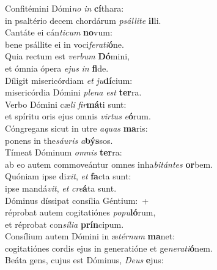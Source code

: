 \evenverse Confitémini Dómi\textit{no} \textit{in} \textbf{cí}thara:~\*\\
\evenverse in psaltério decem chordárum \textit{psál}\textit{li}\textit{te} \textbf{il}li.\\
\oddverse Cantáte ei cán\textit{ti}\textit{cum} \textbf{no}vum:~\*\\
\oddverse bene psállite ei in voci\textit{fe}\textit{ra}\textit{ti}\textbf{ó}ne.\\
\evenverse Quia rectum est \textit{ver}\textit{bum} \textbf{Dó}mini,~\*\\
\evenverse et ómnia ópera \textit{e}\textit{jus} \textit{in} \textbf{fi}de.\\
\oddverse Díligit misericórdiam \textit{et} \textit{ju}\textbf{dí}cium:~\*\\
\oddverse misericórdia Dómini \textit{ple}\textit{na} \textit{est} \textbf{ter}ra.\\
\evenverse Verbo Dómini cæ\textit{li} \textit{fir}\textbf{má}ti sunt:~\*\\
\evenverse et spíritu oris ejus omnis \textit{vir}\textit{tus} \textit{e}\textbf{ó}rum.\\
\oddverse Cóngregans sicut in utre \textit{a}\textit{quas} \textbf{ma}ris:~\*\\
\oddverse ponens in the\textit{sáu}\textit{ris} \textit{a}\textbf{býs}sos.\\
\evenverse Tímeat Dóminum \textit{om}\textit{nis} \textbf{ter}ra:~\*\\
\evenverse ab eo autem commoveántur omnes inha\textit{bi}\textit{tán}\textit{tes} \textbf{or}bem.\\
\oddverse Quóniam ipse di\textit{xit}, \textit{et} \textbf{fa}cta sunt:~\*\\
\oddverse ipse mandá\textit{vit}, \textit{et} \textit{cre}\textbf{á}ta sunt.\\
\evenverse Dóminus díssipat consília Géntium:~+\\
\evenverse  réprobat autem cogitatiónes \textit{po}\textit{pu}\textbf{ló}rum,~\*\\
\evenverse et réprobat con\textit{sí}\textit{li}\textit{a} \textbf{prín}cipum.\\
\oddverse Consílium autem Dómini in æ\textit{tér}\textit{num} \textbf{ma}net:~\*\\
\oddverse cogitatiónes cordis ejus in generatióne et ge\textit{ne}\textit{ra}\textit{ti}\textbf{ó}nem.\\
\evenverse Beáta gens, cujus est Dóminus, \textit{De}\textit{us} \textbf{e}jus:~\*\\
